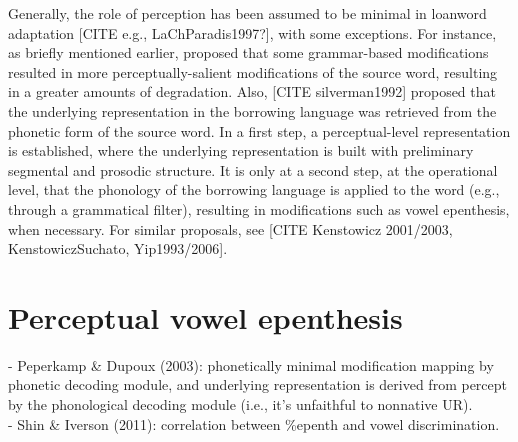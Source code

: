 Generally, the role of perception has been assumed to be minimal in loanword adaptation [CITE e.g., LaChParadis1997?], with some exceptions. For instance, as briefly mentioned earlier, \cite{steriade2001} proposed that some grammar-based modifications resulted in more perceptually-salient modifications of the source word, resulting in a greater amounts of degradation.
Also, [CITE silverman1992] proposed that the underlying representation in the borrowing language was retrieved from the phonetic form of the source word. In a first step, a perceptual-level representation is established, where the underlying representation is built with preliminary segmental and prosodic structure. It is only at a second step, at the operational level, that the phonology of the borrowing language is applied to the word (e.g., through a grammatical filter), resulting in modifications such as vowel epenthesis, when necessary. For similar proposals, see [CITE Kenstowicz 2001/2003, KenstowiczSuchato, Yip1993/2006].  



\section{Perceptual vowel epenthesis}

    - Peperkamp \& Dupoux (2003): phonetically minimal modification mapping by phonetic decoding module, and underlying representation is derived from percept by the phonological decoding module (i.e., it's unfaithful to nonnative UR). \\

  - Shin \& Iverson (2011): correlation between \%epenth and vowel discrimination.   \\

